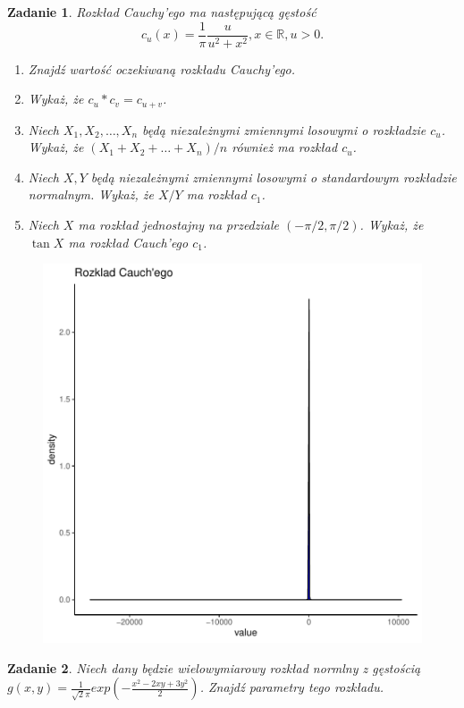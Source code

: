 \documentclass{mwart}
\newtheorem{zd}{Zadanie}
\begin{document}
\begin{zd}
Rozkład Cauchy'ego ma następującą gęstość
\begin{displaymath}
c_u(x) = \frac{1}{\pi}\frac{u}{u^2 + x^2}, x\in \mathbb{R}, u >0.
\end{displaymath}
\begin{enumerate}
\item Znajdź wartość oczekiwaną rozkładu Cauchy'ego.
\item Wykaż, że $c_u\ast c_v = c_{u+v}$.
\item Niech $X_1, X_2, \dots, X_n$ będą niezależnymi zmiennymi losowymi o rozkładzie $c_u$. Wykaż, że $(X_1+X_2+\dots +X_n)/n$ również ma rozkład $c_u$.
\item Niech $X, Y$ będą niezależnymi zmiennymi losowymi o standardowym rozkładzie normalnym. Wykaż, że $X/Y$ ma rozkład $c_1$.
\item Niech $X$ ma rozkład jednostajny na przedziale $(-\pi/2, \pi/2)$. Wykaż, że $\tan X$ ma rozkład Cauch'ego $c_1$.
\end{enumerate}
\begin{figure}
\includegraphics{Zestaw1_PS_2020-002}
\end{figure}
\end{zd}

\begin{zd}
Niech dany będzie wielowymiarowy rozkład normlny z gęstością $g(x,y)=\frac{1}{\sqrt{2}\pi}exp\left(-\frac{x^{2}-2xy+3y^{2}}{2}\right)$. Znajdź parametry tego rozkładu.
\end{zd}
\end{document}
